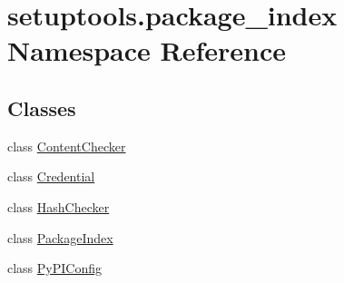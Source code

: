 \hypertarget{namespacesetuptools_1_1package__index}{}\section{setuptools.\+package\+\_\+index Namespace Reference}
\label{namespacesetuptools_1_1package__index}
\subsection*{Classes}
\begin{DoxyCompactItemize}
\item 
class \hyperlink{classsetuptools_1_1package__index_1_1_content_checker}{Content\+Checker}
\item 
class \hyperlink{classsetuptools_1_1package__index_1_1_credential}{Credential}
\item 
class \hyperlink{classsetuptools_1_1package__index_1_1_hash_checker}{Hash\+Checker}
\item 
class \hyperlink{classsetuptools_1_1package__index_1_1_package_index}{Package\+Index}
\item 
class \hyperlink{classsetuptools_1_1package__index_1_1_py_p_i_config}{Py\+P\+I\+Config}
\end{DoxyCompactItemize}
